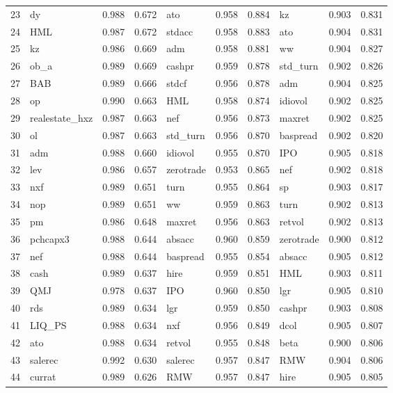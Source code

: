 \begin{landscape}
\begin{footnotesize}
\begin{longtable}{l|lcc|lcc|lcc}
  23 & dy & 0.988 & 0.672 & ato & 0.958 & 0.884 & kz & 0.903 & 0.831 \\ 
  24 & HML & 0.987 & 0.672 & stdacc & 0.958 & 0.883 & ato & 0.904 & 0.831 \\ 
  25 & kz & 0.986 & 0.669 & adm & 0.958 & 0.881 & ww & 0.904 & 0.827 \\ 
  26 & ob\_a & 0.989 & 0.669 & cashpr & 0.959 & 0.878 & std\_turn & 0.902 & 0.826 \\ 
  27 & BAB & 0.989 & 0.666 & stdcf & 0.956 & 0.878 & adm & 0.904 & 0.825 \\ 
  28 & op & 0.990 & 0.663 & HML & 0.958 & 0.874 & idiovol & 0.902 & 0.825 \\ 
  29 & realestate\_hxz & 0.987 & 0.663 & nef & 0.956 & 0.873 & maxret & 0.902 & 0.825 \\ 
  30 & ol & 0.987 & 0.663 & std\_turn & 0.956 & 0.870 & baspread & 0.902 & 0.820 \\ 
  31 & adm & 0.988 & 0.660 & idiovol & 0.955 & 0.870 & IPO & 0.905 & 0.818 \\ 
  32 & lev & 0.986 & 0.657 & zerotrade & 0.953 & 0.865 & nef & 0.902 & 0.818 \\ 
  33 & nxf & 0.989 & 0.651 & turn & 0.955 & 0.864 & sp & 0.903 & 0.817 \\ 
  34 & nop & 0.989 & 0.651 & ww & 0.959 & 0.863 & turn & 0.902 & 0.813 \\ 
  35 & pm & 0.986 & 0.648 & maxret & 0.956 & 0.863 & retvol & 0.902 & 0.813 \\ 
  36 & pchcapx3 & 0.988 & 0.644 & absacc & 0.960 & 0.859 & zerotrade & 0.900 & 0.812 \\ 
  37 & nef & 0.988 & 0.644 & baspread & 0.955 & 0.854 & absacc & 0.905 & 0.812 \\ 
  38 & cash & 0.989 & 0.637 & hire & 0.959 & 0.851 & HML & 0.903 & 0.811 \\ 
  39 & QMJ & 0.978 & 0.637 & IPO & 0.960 & 0.850 & lgr & 0.905 & 0.810 \\ 
  40 & rds & 0.989 & 0.634 & lgr & 0.959 & 0.850 & cashpr & 0.903 & 0.808 \\ 
  41 & LIQ\_PS & 0.988 & 0.634 & nxf & 0.956 & 0.849 & dcol & 0.905 & 0.807 \\ 
  42 & ato & 0.988 & 0.634 & retvol & 0.955 & 0.848 & beta & 0.900 & 0.806 \\ 
  43 & salerec & 0.992 & 0.630 & salerec & 0.957 & 0.847 & RMW & 0.904 & 0.806 \\ 
  44 & currat & 0.989 & 0.626 & RMW & 0.957 & 0.847 & hire & 0.905 & 0.805 \\ 

\end{longtable}
\end{footnotesize}
\end{landscape}
